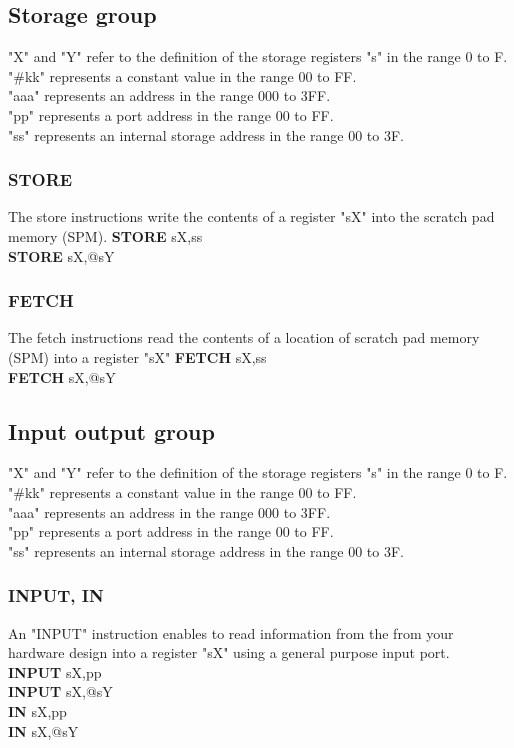 {        \subsection{Storage group}
            "X" and "Y" refer to the definition of the storage registers "s" in the range 0 to F.\\
            "\#kk" represents a constant value in the range 00 to FF.\\
            "aaa" represents an address in the range 000 to 3FF.\\
            "pp" represents a port address in the range 00 to FF.\\
            "ss" represents an internal storage address in the range 00 to 3F.\\
        \subsubsection{STORE}
            The store instructions write the contents of a register "sX" into the scratch pad memory (SPM).
                \textbf{STORE} sX,ss\\
                \textbf{STORE} sX,@sY\\

        \subsubsection{FETCH}
            The fetch instructions read the contents of a location of scratch pad memory (SPM) into a register "sX"
                \textbf{FETCH} sX,ss\\
                \textbf{FETCH} sX,@sY\\

        \subsection{Input output group}
            "X" and "Y" refer to the definition of the storage registers "s" in the range 0 to F.\\
            "\#kk" represents a constant value in the range 00 to FF.\\
            "aaa" represents an address in the range 000 to 3FF.\\
            "pp" represents a port address in the range 00 to FF.\\
            "ss" represents an internal storage address in the range 00 to 3F.\\
        \subsubsection{INPUT, IN}
            An "INPUT" instruction enables to read information from the from your hardware design into a register "sX" using a general purpose input port.\\
                \textbf{INPUT}      sX,pp\\
                \textbf{INPUT}      sX,@sY\\
                \textbf{IN}         sX,pp\\
                \textbf{IN}         sX,@sY\\
}
